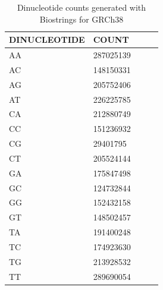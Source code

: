 \begin{table}[ht]
\caption[Dinucleotide counts of GRCh38]{Dinucleotide counts generated with Biostrings \cite{Pages2020} for GRCh38}\label{A:mmf:tab:dicounts}
\centering
{}
\begin{tabular}{|C{0.3\linewidth} | R{0.14\textwidth}|}
\toprule
 \hline
 \textbf{DINUCLEOTIDE} & \textbf{COUNT}\\
 \hline
       AA   & \num{287025139} \\
       AC   & \num{148150331} \\
       AG   & \num{205752406} \\
       AT   & \num{226225785} \\
       CA   & \num{212880749} \\
       CC   & \num{151236932} \\
       CG   & \num{29401795} \\
       CT   & \num{205524144} \\
       GA   & \num{175847498} \\
       GC   & \num{124732844} \\
       GG   & \num{152432158} \\
       GT   & \num{148502457} \\
       TA   & \num{191400248} \\
       TC   & \num{174923630} \\
       TG   & \num{213928532} \\
       TT   & \num{289690054} \\ 
 \hline
 \bottomrule
\end{tabular}
\end{table}

